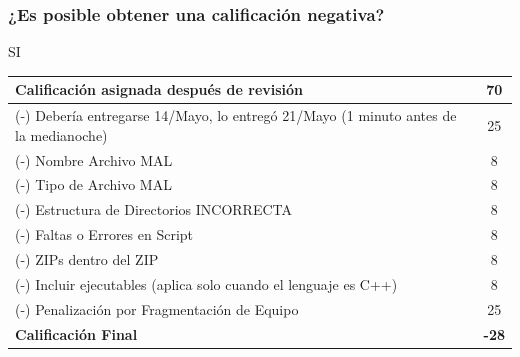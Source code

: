 \begin{frame}
\frametitle{¿Es posible obtener una calificación negativa?}
SI
\begin{center}
\begin{tabular}{p{12cm}|c}
\hline
Calificación asignada después de revisión & 70 \\ \hline
(-) Debería entregarse 14/Mayo, lo entregó 21/Mayo (1 minuto antes de la medianoche) & 25 \\
(-) Nombre Archivo MAL & 8 \\ 
(-) Tipo de Archivo MAL & 8 \\ 
(-) Estructura de Directorios INCORRECTA & 8 \\ 
(-) Faltas o Errores en Script  & 8 \\ 
(-) ZIPs dentro del ZIP  & 8 \\ 
(-) Incluir ejecutables (aplica solo cuando el lenguaje es C++)  & 8 \\ 
(-) Penalización por Fragmentación de Equipo  & 25 \\ \hline
\textbf{Calificación Final}  & \textbf{-28} \\ 
\hline
\hline
\end{tabular}


\end{center}


\end{frame}




